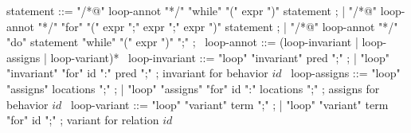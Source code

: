 \begin{syntax}
  statement ::= "/*@" loop-annot "*/" "while" "(" expr ")" statement ;
  | "/*@" loop-annot "*/" "for" "(" expr ";" expr ";" expr ")" statement ;
  | "/*@" loop-annot "*/" "do" statement "while" "(" expr ")" ";" ;
  \
  loop-annot ::= (loop-invariant | loop-assigns | loop-variant)*
  \
  loop-invariant ::= "loop" "invariant" pred ";" ;
  | "loop" "invariant" "for" id ":" pred ";" ; invariant for behavior $id$
  \
  loop-assigns ::= "loop" "assigns" locations ";" ;
  | "loop" "assigns" "for" id ":" locations ";" ; assigns for behavior $id$
  \
  loop-variant ::= "loop" "variant" term ";" ;
  | "loop" "variant" term "for" id ";" ; variant for relation $id$
  \
\end{syntax}
